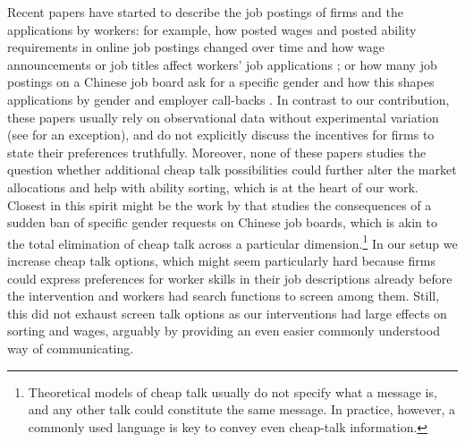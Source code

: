 \documentclass[12pt]{article}
\begin{document}
Recent papers have started to describe the job postings of firms and the applications by workers: for example, how posted wages and posted ability requirements in online job postings changed over time \citep{choi2020wage} and how wage announcements or job titles affect workers' job applications \citep{banfi2019high, belot2022wage, marinescu2020opening}; or how many job postings on a Chinese job board ask for a specific gender \citep{kuhn2013gender} and how this shapes applications by gender and employer call-backs \citep{kuhn2020gender}. In contrast to our contribution, these papers usually rely on observational data without experimental variation (see \cite{belot2022wage} for an exception), and do not explicitly discuss the incentives for firms to state their preferences truthfully. Moreover, none of these papers studies the question whether additional cheap talk possibilities could further alter the market allocations and help with ability sorting, which is at the heart of our work. Closest in this spirit might be the work by \cite{kuhn2023happens} that studies the consequences of a sudden ban of specific gender requests on Chinese job boards, which is akin to the total elimination of cheap talk across a particular dimension.\footnote{Theoretical models of cheap talk usually do not specify what a message is, and any other talk could constitute the same message. In practice, however, a commonly used language is key to convey even cheap-talk information.} In our setup we increase cheap talk options, which might seem particularly hard because firms could express preferences for worker skills in their job descriptions already before the intervention and workers had search functions to screen among them. Still, this did not exhaust screen talk options as our interventions had large effects on sorting and wages, arguably by providing an even easier commonly understood way of communicating. 
\end{document}
